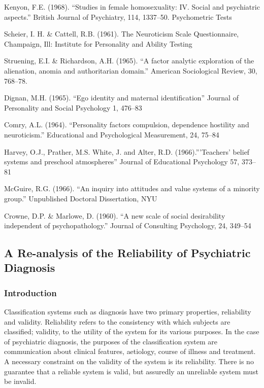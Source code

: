 Kenyon, F.E. (1968). “Studies in female homosexuality: IV. Social and psychiatric aspects.” British Journal of Psychiatry, 114, 1337--50.
Psychometric Tests

Scheier, I. H. \& Cattell, R.B. (1961). The Neuroticism Scale Questionnaire, Champaign, Ill: Institute for Personality and Ability Testing

Struening, E.I. \& Richardson, A.H. (1965). “A factor analytic exploration of the alienation, anomia and authoritarian domain.” American Sociological Review, 30, 768--78.

Dignan, M.H. (1965). “Ego identity and maternal identification” Journal of Personality and Social Psychology 1, 476--83

Comry, A.L. (1964). “Personality factors compulsion, dependence hostility and neuroticism.” Educational and Psychological Measurement, 24, 75--84

Harvey, O.J., Prather, M.S. White, J. and Alter, R.D. (1966).”'Teachers' belief systems and preschool atmospheres” Journal of Educational Psychology 57, 373--81

McGuire, R.G. (1966). “An inquiry into attitudes and value systems of a minority group.” Unpublished Doctoral Dissertation, NYU

Crowne, D.P. \& Marlowe, D. (1960). “A new scale of social desirability independent of psychopathology.” Journal of Consulting Psychology, 24, 349--54

\subsection{A Re-analysis of the Reliability of Psychiatric Diagnosis}
\label{are-analysisofthereliabilityofpsychiatricdiagnosis}

\subsubsection{Introduction}
\label{introduction}

Classification systems such as diagnosis have two primary properties, reliability and validity. Reliability refers to the consistency with which subjects are classified; validity, to the utility of the system for its various purposes. In the case of psychiatric diagnosis, the purposes of the classification system are communication about clinical features, aetiology, course of illness and treatment. A necessary constraint on the validity of the system is its reliability. There is no guarantee that a reliable system is valid, but assuredly an unreliable system must be invalid.

